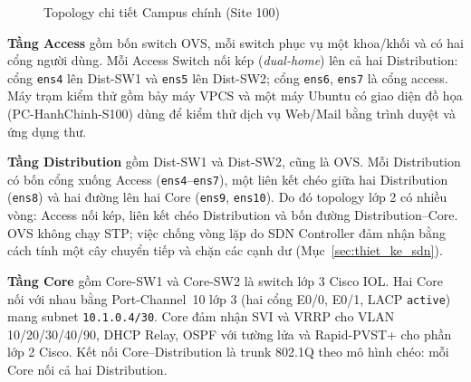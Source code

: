 \begin{figure}[H]
{%
    }
    \caption{Topology chi tiết Campus chính (Site 100)}
    \label{fig:topology_site100}
\end{figure}

\textbf{Tầng Access} gồm bốn switch OVS, mỗi switch phục vụ một khoa/khối và có hai cổng người dùng. Mỗi Access Switch nối kép (\textit{dual-home}) lên cả hai Distribution: cổng \texttt{ens4} lên Dist-SW1 và \texttt{ens5} lên Dist-SW2; cổng \texttt{ens6}, \texttt{ens7} là cổng access. Máy trạm kiểm thử gồm bảy máy VPCS và một máy Ubuntu có giao diện đồ họa (PC-HanhChinh-S100) dùng để kiểm thử dịch vụ Web/Mail bằng trình duyệt và ứng dụng thư.

\textbf{Tầng Distribution} gồm Dist-SW1 và Dist-SW2, cũng là OVS. Mỗi Distribution có bốn cổng xuống Access (\texttt{ens4}--\texttt{ens7}), một liên kết chéo giữa hai Distribution (\texttt{ens8}) và hai đường lên hai Core (\texttt{ens9}, \texttt{ens10}). Do đó topology lớp 2 có nhiều vòng: Access nối kép, liên kết chéo Distribution và bốn đường Distribution--Core. OVS không chạy STP; việc chống vòng lặp do SDN Controller đảm nhận bằng cách tính một cây chuyển tiếp và chặn các cạnh dư (Mục~\ref{sec:thiet_ke_sdn}).

\textbf{Tầng Core} gồm Core-SW1 và Core-SW2 là switch lớp 3 Cisco IOL. Hai Core nối với nhau bằng Port-Channel~10 lớp 3 (hai cổng E0/0, E0/1, LACP \texttt{active}) mang subnet \texttt{10.1.0.4/30}. Core đảm nhận SVI và VRRP cho VLAN 10/20/30/40/90, DHCP Relay, OSPF với tường lửa và Rapid-PVST+ cho phần lớp 2 Cisco. Kết nối Core--Distribution là trunk 802.1Q theo mô hình chéo: mỗi Core nối cả hai Distribution.

